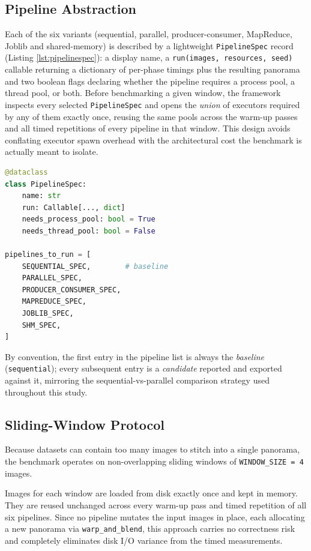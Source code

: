 \documentclass[10pt,twocolumn,letterpaper]{article}
\begin{document}
\subsection{Pipeline Abstraction}
Each of the six variants (sequential, parallel, producer-consumer, MapReduce, Joblib and
shared-memory) is described by a lightweight \texttt{PipelineSpec} record (Listing
\ref{lst:pipelinespec}): a display name, a \texttt{run(images, resources, seed)} callable
returning a dictionary of per-phase timings plus the resulting panorama and two boolean
flags declaring whether the pipeline requires a process pool, a thread pool, or both. Before
benchmarking a given window, the framework inspects every selected \texttt{PipelineSpec} and
opens the \emph{union} of executors required by any of them exactly once, reusing the same
pools across the warm-up passes and all timed repetitions of every pipeline in that window.
This design avoids conflating executor spawn overhead with the architectural cost the benchmark is actually meant to
isolate.

\begin{lstlisting}[language=Python, basicstyle=\small\ttfamily, breaklines=true, frame=single, breakatwhitespace=true, caption={The pipeline abstraction driving the benchmark}, label={lst:pipelinespec}]
@dataclass
class PipelineSpec:
    name: str
    run: Callable[..., dict]
    needs_process_pool: bool = True
    needs_thread_pool: bool = False

pipelines_to_run = [
    SEQUENTIAL_SPEC,        # baseline
    PARALLEL_SPEC,
    PRODUCER_CONSUMER_SPEC,
    MAPREDUCE_SPEC,
    JOBLIB_SPEC,
    SHM_SPEC,
]
\end{lstlisting}

By convention, the first entry in the pipeline list is always the \emph{baseline}
(\texttt{sequential}); every subsequent entry is a \emph{candidate} reported and exported
against it, mirroring the sequential-vs-parallel comparison strategy used throughout this
study.

\subsection{Sliding-Window Protocol}
Because datasets can contain too many images to stitch into a single 
panorama, the benchmark operates on non-overlapping 
sliding windows of \texttt{WINDOW\_SIZE = 4} images. 

Images for each window are loaded from disk exactly once and kept in 
memory. They are reused unchanged across every warm-up pass and timed 
repetition of all six pipelines. Since no pipeline mutates the input 
images in place, each allocating a new panorama via 
\texttt{warp\_and\_blend}, this approach carries no correctness risk and 
completely eliminates disk I/O variance from the timed measurements. 
\end{document}
